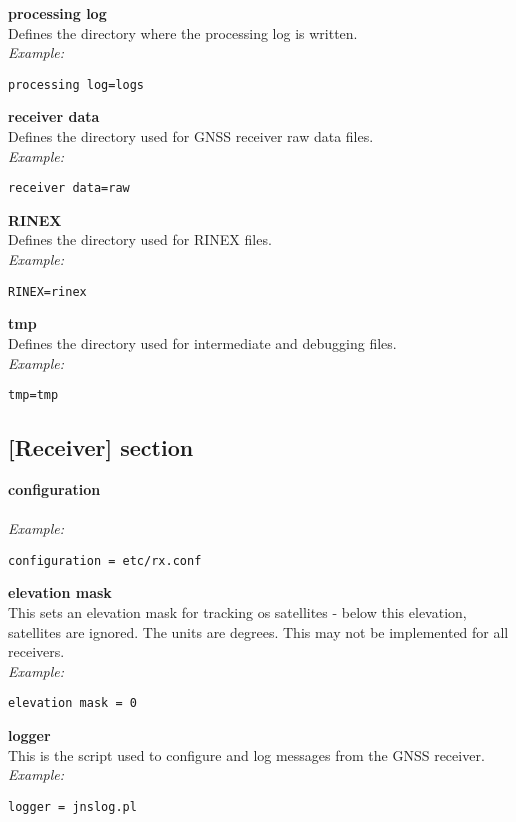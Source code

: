 {\bfseries processing log}\\
Defines the directory where the  processing log is written.\\
\textit{Example:}
\begin{lstlisting}
processing log=logs
\end{lstlisting}

{\bfseries receiver data}\\
Defines the directory used for GNSS receiver raw data files.\\
\textit{Example:}
\begin{lstlisting}
receiver data=raw
\end{lstlisting}

{\bfseries RINEX}\\
Defines the directory used for RINEX files.\\
\textit{Example:}
\begin{lstlisting}
RINEX=rinex
\end{lstlisting}

{\bfseries tmp}\\
Defines the directory used for intermediate and debugging files.\\
\textit{Example:}
\begin{lstlisting}
tmp=tmp
\end{lstlisting}


\subsection{[Receiver] section \label{sgcreceiver}}

\hypertarget{h:receiver}{}

{\bfseries configuration}\\
\\
\textit{Example:}
\begin{lstlisting}
configuration = etc/rx.conf
\end{lstlisting}

{\bfseries elevation mask}\\
This sets an elevation mask for tracking os satellites - below this elevation, satellites
are ignored. The units are degrees. This may not be implemented for all receivers.\\
\textit{Example:}
\begin{lstlisting}
elevation mask = 0
\end{lstlisting}

{\bfseries logger}\\
This is the script used to configure and log messages from the GNSS receiver.\\
\textit{Example:}
\begin{lstlisting}
logger = jnslog.pl
\end{lstlisting}

